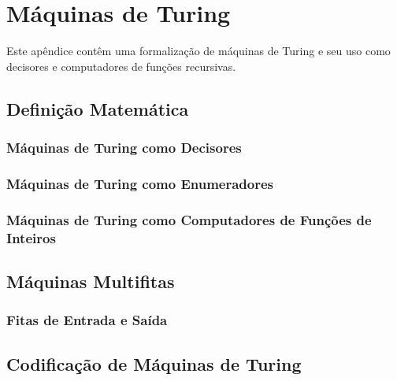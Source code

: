 \chapter{Máquinas de Turing}
\label{maqs_turing}

Este apêndice contêm uma formalização de máquinas de Turing
e seu uso como decisores e computadores de funções recursivas.

\section{Definição Matemática}

\subsection{Máquinas de Turing como Decisores}

\subsection{Máquinas de Turing como Enumeradores}

\subsection{Máquinas de Turing como Computadores de Funções de Inteiros}

\section{Máquinas Multifitas}

\subsection{Fitas de Entrada e Saída}

\section{Codificação de Máquinas de Turing}

